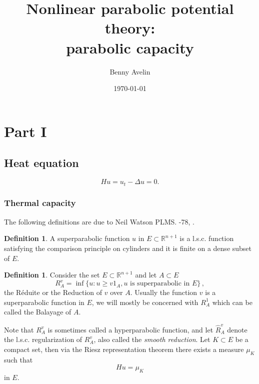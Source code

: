 \documentclass[reqno,a4paper,12pt]{amsart}
\theoremstyle{definition}
\newtheorem{definition}[theorem]{Definition}
\numberwithin{theorem}{section} \numberwithin{equation}{section}
\newcommand{\R}{{\mathbb R}}
\begin{document}
 
\title{Nonlinear parabolic potential theory: \\ \tiny parabolic capacity}
\date{\today}
\author{Benny Avelin}
\maketitle

\section{Part I}
\subsection{Heat equation}
\begin{equation} \nonumber \label{}
	Hu = u_t-\Delta u = 0.
\end{equation}
\subsubsection{Thermal capacity}
The following definitions are due to Neil Watson PLMS. -78, \cite{W}.
\begin{definition}
	A superparabolic function $u$ in $E \subset \R^{n+1}$ is a l.s.c. function satisfying the comparison principle on cylinders and it is finite on a dense subset of $E$.
\end{definition}
\begin{definition}
	Consider the set $E \subset \R^{n+1}$ and let $A \subset E$
	\begin{equation} \nonumber \label{}
		R_A^v = \inf \{u: u \geq v 1_A, \text{$u$ is superparabolic in $E$}\}\,,
	\end{equation}
	the Réduite or the Reduction of $v$ over $A$. Usually the function $v$ is a superparabolic function in $E$, we will mostly be concerned with $R_A^1$ which can be called the Balayage of $A$.
\end{definition}
Note that $R_A^v$ is sometimes called a hyperparabolic function, and let $\hat R_A^v$ denote the l.s.c. regularization of $R_A^v$, also called the \emph{smooth reduction}.
Let $K \subset E$ be a compact set, then via the Riesz representation theorem there exists a measure $\mu_K$ such that
\begin{equation} \nonumber \label{}
	Hu = \mu_K
\end{equation}
in $E$.
\end{document}
